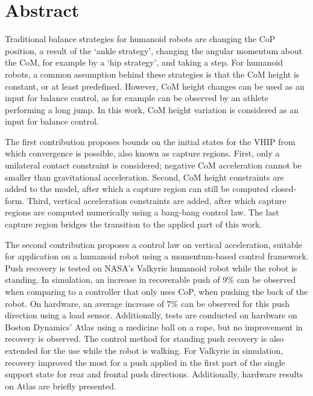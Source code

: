 %
\chapter*{Abstract}%

Traditional balance strategies for humanoid robots are changing the \ac{CoP} position, a result of the `ankle strategy', changing the angular momentum about the \ac{CoM}, for example by a `hip strategy', and taking a step. For humanoid robots, a common assumption behind these strategies is that the \ac{CoM} height is constant, or at least predefined. However, \ac{CoM} height changes can be used as an input for balance control, as for example can be observed by an athlete performing a long jump. In this work, \ac{CoM} height variation is considered as an input for balance control. 

The first contribution proposes bounds on the initial states for the \ac{VHIP} from which convergence is possible, also known as capture regions. First, only a unilateral contact constraint is considered; negative \ac{CoM} acceleration cannot be smaller than gravitational acceleration. Second, \ac{CoM} height constraints are added to the model, after which a capture region can still be computed closed-form. Third, vertical acceleration constraints are added, after which capture regions are computed numerically using a bang-bang control law. The last capture region bridges the transition to the applied part of this work.

The second contribution proposes a control law on vertical acceleration, suitable for application on a humanoid robot using a momentum-based control framework. Push recovery is tested on NASA's Valkyrie humanoid robot while the robot is standing. In simulation, an increase in recoverable push of $9$\% can be observed when comparing to a controller that only uses \ac{CoP}, when pushing the back of the robot. On hardware, an average increase of $7$\% can be observed for this push direction using a load sensor. Additionally, tests are conducted on hardware on Boston Dynamics' Atlas using a medicine ball on a rope, but no improvement in recovery is observed. The control method for standing push recovery is also extended for the use while the robot is walking. For Valkyrie in simulation, recovery improved the most for a push applied in the first part of the single support state for rear and frontal push directions. Additionally, hardware results on Atlas are briefly presented.